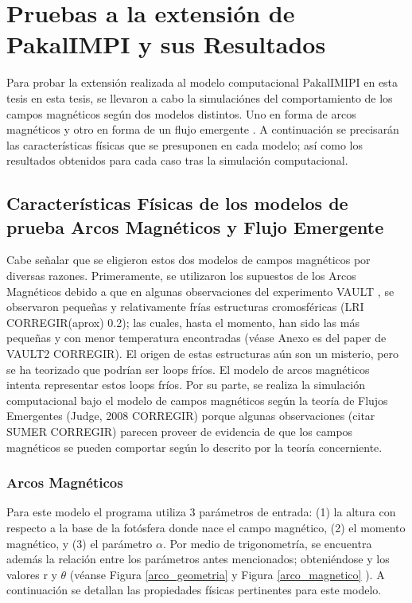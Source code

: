\documentclass[9pt]{book}
\begin{document}
\chapter{Pruebas a la extensi\'on de PakalIMPI y sus Resultados}

Para probar la extensi\'on realizada al modelo computacional PakalIMIPI en esta tesis en esta tesis, se llevaron a cabo la simulaci\'ones del comportamiento de los campos magn\'eticos seg\'un dos modelos distintos. Uno en forma de arcos magn\'eticos \cite{loops} y otro en forma de un flujo emergente \cite{flujoemergente}. A continuaci\'on se precisar\'an las caracter\'isticas f\'isicas que se presuponen en cada modelo; as\'i como los resultados obtenidos para cada caso tras la simulaci\'on computacional.

\section{Caracter\'isticas F\'isicas de los modelos de prueba \- Arcos Magn\'eticos y Flujo Emergente}

Cabe se\~nalar que se eligieron estos dos modelos de campos magn\'eticos por diversas razones. Primeramente, se utilizaron los supuestos de los Arcos Magn\'eticos debido a que en algunas observaciones del experimento VAULT \cite{VAULT}, se observaron peque\~nas y relativamente fr\'ias estructuras cromosf\'ericas (LRI CORREGIR(aprox) 0.2); las cuales, hasta el momento, han sido las m\'as peque\~nas y con menor temperatura encontradas (v\'ease Anexo es del paper de VAULT2 CORREGIR). El origen de estas estructuras a\'un son un misterio, pero se ha teorizado que podr\'ian ser loops fr\'ios\cite{VAULT2}. El modelo de arcos magn\'eticos intenta representar estos loops fr\'ios. Por su parte, se realiza la simulaci\'on computacional bajo el modelo de campos magn\'eticos seg\'un la teor\'ia de Flujos Emergentes (Judge, 2008 CORREGIR) porque algunas observaciones (citar SUMER CORREGIR) parecen proveer de evidencia de que los campos magn\'eticos se pueden comportar seg\'un lo descrito por la teor\'ia concerniente. 

\subsection{Arcos Magn\'eticos}

Para este modelo el programa utiliza 3 par\'ametros de entrada: (1) la altura con respecto a la base de la fot\'osfera donde nace el campo magn\'etico, (2) el momento magn\'etico, y (3) el par\'ametro $\alpha$. Por medio de trigonometr\'ia, se encuentra adem\'as la relaci\'on entre los par\'ametros antes mencionados; obteni\'endose y los valores r y $\theta$ (v\'eanse Figura \ref{arco_geometria} y Figura \ref{arco_magnetico} ). A continuaci\'on se detallan las propiedades f\'isicas pertinentes para este modelo.
\end{document}
